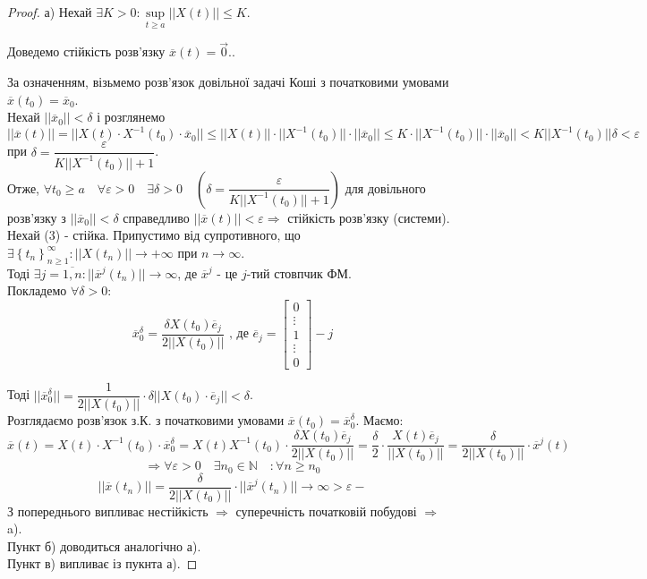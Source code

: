 \begin{proof}
 а) \fbox{$\Leftarrow$} Нехай $ \exists K > 0 : \sup\limits_{t\geq a} ||X(t)|| \leq K$.

 Доведемо стійкість розв'язку $\overline{x} (t) = \vec{0}. $.

За означенням, візьмемо розв'язок довільної задачі Коші з початковими умовами $\overline{x } (t_0) = \overline{x}_0$.\\
Нехай $|| \overline{x}_0 || < \delta$ і розглянемо $ || \overline{x} (t)|| = || X(t) \cdot X^{-1} (t_0) \cdot \overline{x}_0 || \leq ||X(t)|| \cdot || X^{-1} (t_0)|| \cdot || \overline{x}_0|| \leq K \cdot || X^{-1} (t_0)|| \cdot || \overline{x}_0|| < K || X^{-1} (t_0)||\delta < \varepsilon $ при $ \delta = \dfrac{\varepsilon }{K || X^{-1} (t_0)|| + 1} $.\\
Отже, $\forall t_0 \geq  a \quad \forall \varepsilon >0 \quad \exists \delta > 0 \quad \left(  \delta = \dfrac{\varepsilon }{K || X^{-1} (t_0)|| + 1}  \right)$  для довільного розв'язку з $ || \overline{x}_0|| < \delta$ справедливо $ ||\overline{x} (t)|| < \varepsilon  \Longrightarrow $ стійкість розв'язку (системи).\\
\fbox{$\Rightarrow$} Нехай (3) - стійка. Припустимо від супротивного, що $\exists  \left\lbrace t_n \right\rbrace_{n\geq 1}^{\infty} : ||X(t_n)|| \to {+\infty} $ при $ n \to \infty$.\\
Тоді $\exists j = \overline{1, n} : || \overline{x}^{j} (t_n)|| \to \infty$, де $\overline{x}^j$  - це $j$-тий стовпчик ФМ. \\ Покладемо $\forall \delta > 0:$
$$
\overline{x}^{\delta}_0 = \frac{\delta X(t_0) \overline{e}_j}{2 ||X(t_0)||} \text{ , де }\overline{e}_j = \begin{bmatrix}
 0\\
 \vdots\\
 1\\
 \vdots\\
 0
\end{bmatrix} - j
$$

Тоді $|| \overline{x}_0^{\delta}|| = \dfrac{1}{ 2 ||X(t_0)||}  \cdot \delta ||X(t_0) \cdot \overline{e}_j|| < \delta $.\\
Розглядаємо розв'язок з.К. з початковими умовами $ \overline{x} (t_0) = \overline{x} _0 ^ \delta$. Маємо:
$$
\overline{x} (t) = X(t) \cdot X^{-1}(t_0) \cdot \overline{x}_0 ^\delta = X(t) X^{-1} (t_0) \cdot \dfrac{ \delta X(t_0) \overline{e}_j}{ 2 ||X(t_0)||} = \frac{\delta}{2} \cdot \frac{X(t) \overline{e}_j}{ ||X(t_0)||} =   \frac{\delta}{2 ||X(t_0)|| } \cdot \overline{x}^j (t)
$$
$$
\Longrightarrow \forall \varepsilon >0 \quad \exists n_0 \in \mathbb{N} \quad : \forall n \geq n_0
$$
$$
||\overline{x} (t_n)|| = \frac{\delta}{ 2 ||X(t_0)|| } \cdot ||\overline{x}^j (t_n)|| \to \infty > \varepsilon  -
$$
З попереднього випливає нестійкість $ \Rightarrow  $ суперечність початковій побудові $ \Rightarrow$ a).\\
Пункт б) доводиться аналогічно а).\\
Пункт в) випливає із пукнта а).
\end{proof}


